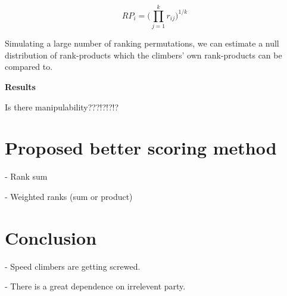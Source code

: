 \documentclass{article}\usepackage[]{graphicx}\usepackage[]{color}
\begin{document}
$$ RP_i = \Big( \prod_{j=1}^k r_{ij} \Big)^{1/k} $$

Simulating a large number of ranking permutations, we can estimate a null distribution of rank-products which the climbers' own rank-products can be compared to.

\textbf{Results}



Is there manipulability???!?!?!?

% 

\section{Proposed better scoring method}

- Rank sum

- Weighted ranks (sum or product)

\section{Conclusion}

- Speed climbers are getting screwed.  

- There is a great dependence on irrelevent party. 




\end{document}
